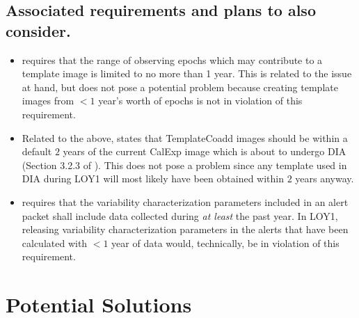 \documentclass[DM,lsstdraft,toc]{lsstdoc}
\begin{document}
\subsection{Associated requirements and plans to also consider.}

\begin{itemize}
\item {} requires that the range of observing epochs which may contribute to a template image is limited to no more than 1 year. This is related to the issue at hand, but does not pose a potential problem because creating template images from $<1$ year's worth of epochs is not in violation of this requirement.
\item Related to the above,  states that TemplateCoadd images should be within a default $2$ years of the current CalExp image which is about to undergo DIA (Section 3.2.3 of \cite{LDM-151}). This does not pose a problem since any template used in DIA during LOY1 will most likely have been obtained within $2$ years anyway.
\item {} requires that the variability characterization parameters included in an alert packet shall include data collected during {\em at least} the past year. In LOY1, releasing variability characterization parameters in the alerts that have been calculated with $<1$ year of data would, technically, be in violation of this requirement. 
\end{itemize}





\section{Potential Solutions}\label{sec:potsol}
\end{document}
